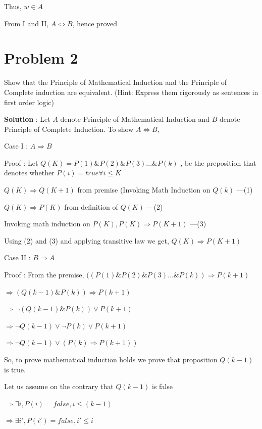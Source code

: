 \documentclass{article}
\begin{document}
    \qquad Thus, $w \in A$
    
    \quad From I and II, $A \iff B$, hence proved
    
    
    \section*{Problem 2} Show that the Principle of Mathematical Induction and the Principle of Complete induction are equivalent.
(Hint: Express them rigorously as sentences in first order logic)

    \textbf{Solution} : 
    Let $A$ denote Principle of Mathematical Induction and $B$ denote Principle of Complete Induction. To show $A \iff B$,
    
    Case I : $A \Longrightarrow B$
    
    Proof : Let $Q(K) = P(1) \& P(2) \& P(3) ... \& P(k)$ , be the preposition that denotes whether $P(i) = true \forall i \leq K$
    
    \quad $Q(K) \Longrightarrow Q(K + 1)$ from premise (Invoking Math Induction on $Q(k)$ ---(1)
    
    \quad $Q(K) \Longrightarrow P(K)$ from definition of $Q(K)$ ---(2)
    
    \quad Invoking math induction on $P(K),  P(K) \Longrightarrow P(K + 1)$ ---(3)
    
    \quad Using (2) and (3) and applying transitive law we get, $Q(K) \Longrightarrow P(K + 1)$
    
    Case II : $B \Longrightarrow A$
    
    Proof : From the premise, $((P(1) \& P(2) \& P(3) ... \& P(k)) \Longrightarrow P(k + 1)$
    
    \quad $\Longrightarrow (Q(k - 1) \& P(k)) \Longrightarrow P(k + 1)$
    
    \quad $\Longrightarrow \neg (Q(k - 1) \& P(k)) \lor P(k+1)$

    \quad $\Longrightarrow \neg Q(k - 1) \lor \neg P(k) \lor P(k+1)$

    \quad $\Longrightarrow \neg Q(k - 1) \lor (P(k) \Longrightarrow P(k + 1))$
    
    \quad So, to prove mathematical induction holds we prove that proposition $Q(k - 1)$ is true.
    
    \quad Let us assume on the contrary that $Q(k - 1)$ is false
    
    \quad $\Longrightarrow \exists i, P(i) = false, i \leq (k - 1)$
    
    \quad $\Longrightarrow \exists i', P(i') = false, i' \leq i$
    
\end{document}
